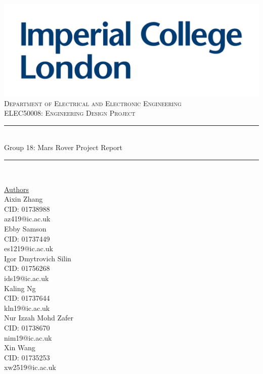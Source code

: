\documentclass[11pt, a4paper]{article}
\begin{document}
\begin{titlepage}
	\newcommand{\HRule}{\rule{\linewidth}{0.5mm}}
    \includegraphics[scale=0.1]{./Images/Imperial_Logo.jpg} 
    \\
    \center 
	\textsc{\large Department of Electrical and Electronic Engineering }\\[0.5cm] 
	\textsc{\normalsize ELEC50008: Engineering Design Project}\\[0.5cm] 
    
	\HRule \\[0.4cm]
	Group 18: Mars Rover Project Report
    \HRule \\[1.5cm]
     
    \begin{center}
		\underline{Authors}\\[0.5cm] 
        Aixin Zhang \\ CID: 01738988 \\ az419@ic.ac.uk \\ [0.5cm]

        Ebby Samson \\ CID: 01737449 \\ es1219@ic.ac.uk \\ [0.5cm]
        
        Igor Dmytrovich Silin \\ CID: 01756268 \\ ids19@ic.ac.uk \\ [0.5cm]

        Kaling Ng \\ CID: 01737644 \\ kln19@ic.ac.uk \\ [0.5cm]

        Nur Izzah Mohd Zafer \\ CID: 01738670 \\ nim19@ic.ac.uk \\ [0.5cm]    
        
        Xin Wang \\ CID: 01735253 \\ xw2519@ic.ac.uk \\ [0.5cm]

	\end{center} \large

    \vfill 
    \makeatletter
    \@date 
    \makeatother
\end{titlepage}
\end{document}
